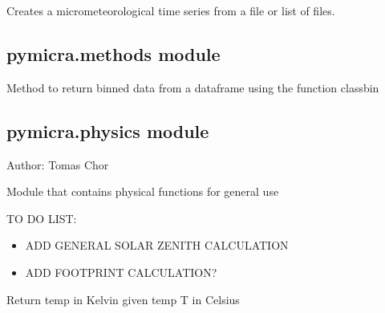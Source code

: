 \documentclass[a4paper,10pt,english]{sphinxmanual}
\begin{document}

\begin{fulllineitems}
\label{pymicra:pymicra.io.timeSeries}
Creates a micrometeorological time series from a file or list of files.

\end{fulllineitems}



\subsection{pymicra.methods module}
\label{pymicra:module-pymicra.methods}\label{pymicra:pymicra-methods-module}

\begin{fulllineitems}
\label{pymicra:pymicra.methods.binwrapper}
Method to return binned data from a dataframe using the function classbin

\end{fulllineitems}



\subsection{pymicra.physics module}
\label{pymicra:pymicra-physics-module}\label{pymicra:module-pymicra.physics}
Author: Tomas Chor

Module that contains physical functions for general use

TO DO LIST:
\begin{itemize}
\item {} 
ADD GENERAL SOLAR ZENITH CALCULATION

\item {} 
ADD FOOTPRINT CALCULATION?

\end{itemize}

\begin{fulllineitems}
\label{pymicra:pymicra.physics.CtoK}
Return temp in Kelvin given temp T in Celsius

\end{fulllineitems}
\end{document}
